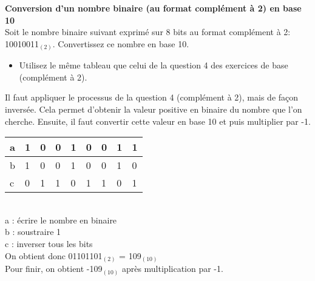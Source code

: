 \begin{Exercice}[5 minutes] \textbf{Conversion d'un nombre binaire (au format complément à 2) en base 10}\\
    
    Soit le nombre binaire suivant exprimé sur 8 bits au format complément à 2: 10010011$_{(2)}$. Convertissez ce nombre en base 10. \\
	
    \begin{conseil}
    
    \begin{itemize}
    	\item Utilisez le même tableau que celui de la question 4 des exercices de base (complément à 2).
    \end{itemize}
    
    \end{conseil}
    
    \begin{solution}
       Il faut appliquer le processus de la question 4 (complément à 2), mais de façon inversée. Cela permet d'obtenir la valeur positive en binaire du nombre que l'on cherche. Ensuite, il faut convertir cette valeur en base 10 et puis multiplier par -1. \\
       
       \begin{tabular}{| p{1cm} | p{1cm} | p{1cm} | p{1cm} | p{1cm} | p{1cm} | p{1cm} | p{1cm} | p{1cm} |} 
            \hline
            a & 1 & 0 & 0 & 1 & 0 & 0 & 1 & 1 \\ [0.5ex] 
            \hline
            b & 1 & 0 & 0 & 1 & 0 & 0 & 1 & 0 \\ [0.5ex]
            \hline
            c & 0 & 1 & 1 & 0 & 1 & 1 & 0 & 1 \\ [0.5ex]
            \hline
        \end{tabular} \\
        
        a : écrire le nombre en binaire \\
        
        b : soustraire 1 \\
        
        c : inverser tous les bits \\
        
        On obtient donc 01101101$_{(2)}$ = 109$_{(10)}$ \\
        
        Pour finir, on obtient -109$_{(10)}$ après multiplication par -1.
       
    \end{solution}
\end{Exercice}


